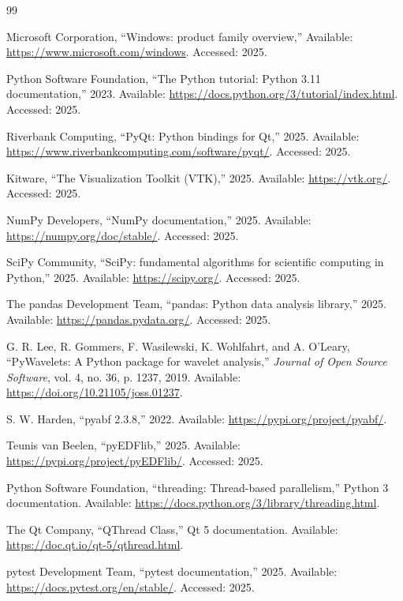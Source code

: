 \documentclass[12pt, letterpaper]{article}
\begin{document}
\begin{thebibliography}{99}

Microsoft Corporation, ``Windows: product family overview,'' Available: \url{https://www.microsoft.com/windows}. Accessed: 2025.

Python Software Foundation, ``The Python tutorial: Python 3.11 documentation,'' 2023. Available: \url{https://docs.python.org/3/tutorial/index.html}. Accessed: 2025.

Riverbank Computing, ``PyQt: Python bindings for Qt,'' 2025. Available: \url{https://www.riverbankcomputing.com/software/pyqt/}. Accessed: 2025.

Kitware, ``The Visualization Toolkit (VTK),'' 2025. Available: \url{https://vtk.org/}. Accessed: 2025.

NumPy Developers, ``NumPy documentation,'' 2025. Available: \url{https://numpy.org/doc/stable/}. Accessed: 2025.

SciPy Community, ``SciPy: fundamental algorithms for scientific computing in Python,'' 2025. Available: \url{https://scipy.org/}. Accessed: 2025.

The pandas Development Team, ``pandas: Python data analysis library,'' 2025. Available: \url{https://pandas.pydata.org/}. Accessed: 2025.

G. R. Lee, R. Gommers, F. Wasilewski, K. Wohlfahrt, and A. O'Leary, ``PyWavelets: A Python package for wavelet analysis,'' \textit{Journal of Open Source Software}, vol. 4, no. 36, p. 1237, 2019. Available: \url{https://doi.org/10.21105/joss.01237}.

S. W. Harden, ``pyabf 2.3.8,'' 2022. Available: \url{https://pypi.org/project/pyabf/}.

Teunis van Beelen, ``pyEDFlib,'' 2025. Available: \url{https://pypi.org/project/pyEDFlib/}. Accessed: 2025.

Python Software Foundation, ``threading: Thread-based parallelism,'' Python 3 documentation. Available: \url{https://docs.python.org/3/library/threading.html}.

The Qt Company, ``QThread Class,'' Qt 5 documentation. Available: \url{https://doc.qt.io/qt-5/qthread.html}.

pytest Development Team, ``pytest documentation,'' 2025. Available: \url{https://docs.pytest.org/en/stable/}. Accessed: 2025.


\end{thebibliography}
\end{document}
